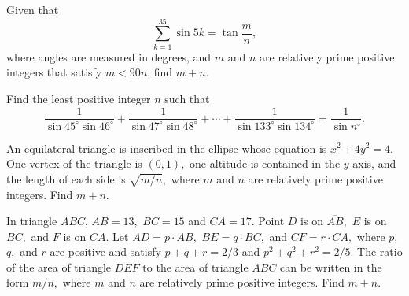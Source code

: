\documentclass[11pt]{article}
\theoremstyle{definition}
\begin{document}
%	




\begin{question}[name={1999 AIME, \href{https://artofproblemsolving.com/community/c4p392229}{Problem 11}}]
	Given that $$\sum_{k=1}^{35}\sin 5k=\tan \frac mn,$$ where angles are measured in degrees, and $m$ and $n$ are relatively prime positive integers that satisfy $ m<90n$, find $m+n$.
\end{question}


%	






\begin{question}[name={2000 AIME II, \href{https://artofproblemsolving.com/community/c4p385901}{Problem 15}}]
	Find the least positive integer $n$ such that\[ \frac 1{\sin 45^\circ\sin 46^\circ}+\frac 1{\sin 47^\circ\sin 48^\circ}+\cdots+\frac 1{\sin 133^\circ\sin 134^\circ}=\frac 1{\sin n^\circ}. \]
\end{question}


%	





\begin{question}[name={2001 AIME I, \href{https://artofproblemsolving.com/community/c4p384176}{Problem 5}}]
	An equilateral triangle is inscribed in the ellipse whose equation is $x^2+4y^2=4.$ One vertex of the triangle is $(0,1),$ one altitude is contained in the $y$-axis, and the length of each side is $\sqrt{ m/n},$ where $m$ and $n$ are relatively prime positive integers. Find $m+n.$
\end{question}








\begin{question}[name={2001 AIME I, \href{https://artofproblemsolving.com/community/c4p384191}{Problem 9}}]
	In triangle $ABC$, $AB=13,$ $BC=15$ and $CA=17.$ Point $D$ is on $\overline{AB},$ $E$ is on $\overline{BC},$ and $F$ is on $\overline{CA}.$ Let $AD=p\cdot AB,$ $BE=q\cdot BC,$ and $CF=r\cdot CA,$ where $p,$ $q,$ and $r$ are positive and satisfy $p+q+r=2/3$ and $p^2+q^2+r^2=2/5.$ The ratio of the area of triangle $DEF$ to the area of triangle $ABC$ can be written in the form $m/n,$ where $m$ and $n$ are relatively prime positive integers. Find $m+n.$
	
\end{question}
\end{document}

